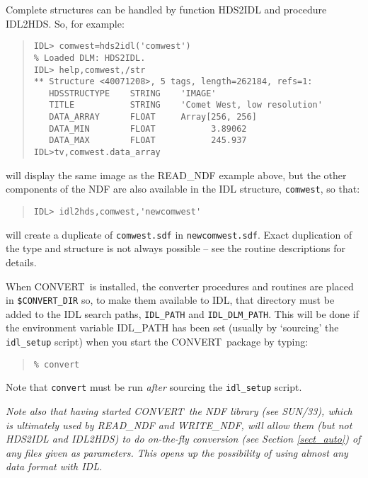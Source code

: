 \documentclass[twoside,11pt]{article}
\newcommand{\htmlref}[2]{#1}
\newcommand{\latex}[1]{#1}
\newcommand{\xref}[3]{#1}
\newcommand{\CONVERT}{{\footnotesize CONVERT}}
\begin{document}
Complete structures can be handled by function
\htmlref{HDS2IDL}{HDS2IDL}
and procedure
\htmlref{IDL2HDS}{IDL2HDS}.
So, for example:
\begin{quote} \begin{verbatim}
IDL> comwest=hds2idl('comwest') 
% Loaded DLM: HDS2IDL.
IDL> help,comwest,/str
** Structure <40071208>, 5 tags, length=262184, refs=1:
   HDSSTRUCTYPE    STRING    'IMAGE'
   TITLE           STRING    'Comet West, low resolution'
   DATA_ARRAY      FLOAT     Array[256, 256]
   DATA_MIN        FLOAT           3.89062
   DATA_MAX        FLOAT           245.937
IDL>tv,comwest.data_array
\end{verbatim} \end{quote}
will display the same image as the READ\_NDF example above, but the other
components of the NDF are also available in the IDL structure,
\texttt{comwest}, so that:
\begin{quote} \begin{verbatim}
IDL> idl2hds,comwest,'newcomwest'
\end{verbatim} \end{quote}
will create a duplicate of \texttt{comwest.sdf} in \texttt{newcomwest.sdf}.
Exact duplication of the type and structure is not always possible -- see the 
routine descriptions for details.

When \CONVERT\ is installed, the converter procedures and routines are
placed in \texttt{\$CONVERT\_DIR} so, to make them available to IDL,
that directory must be added to the IDL search paths, \texttt{IDL\_PATH} and
\texttt{IDL\_DLM\_PATH}. This will be done if the environment variable 
IDL\_PATH has been set (usually by `sourcing' the 
\texttt{idl\_setup} script) when you start the \CONVERT\ package by typing:
\begin{quote} \begin{verbatim}
% convert
\end{verbatim} \end{quote}
Note that \texttt{convert} must be run \emph{after} sourcing the 
\texttt{idl\_setup} script.

\emph{Note also that having started \CONVERT\, 
\xref{the NDF library}{sun33}{abstract}\latex{ (see SUN/33)},
which is ultimately used by READ\_NDF and WRITE\_NDF, will
allow them (but not HDS2IDL and IDL2HDS) to do 
\htmlref{on-the-fly conversion}{sect_auto}\latex{ (see Section \ref{sect_auto})}
of any files given as parameters. This opens up the possibility of using almost 
any data format with IDL.}
\end{document}
